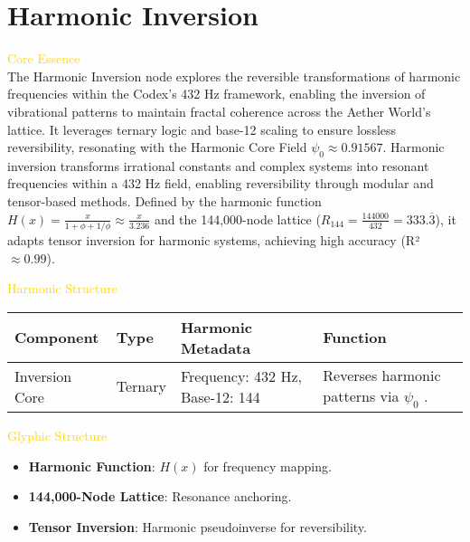 
\section{Harmonic Inversion}
\label{sec:codex_harmonic_inversion}



\textcolor{gold}{ Core Essence } \\
The Harmonic Inversion node explores the reversible transformations of harmonic frequencies within the Codex’s 432 Hz framework, enabling the inversion of vibrational patterns to maintain fractal coherence across the Aether World’s lattice. It leverages ternary logic and base-12 scaling to ensure lossless reversibility, resonating with the Harmonic Core Field \(\psi_0 \approx 0.91567\). Harmonic inversion transforms irrational constants and complex systems into resonant frequencies within a 432 Hz field, enabling reversibility through modular and tensor-based methods. Defined by the harmonic function \( H(x) = \frac{x}{1 + \phi + 1/\phi} \approx \frac{x}{3.236} \) and the 144,000-node lattice (\( R_{144} = \frac{144000}{432} = 333.\overline{3} \)), it adapts tensor inversion for harmonic systems, achieving high accuracy (R² \(\approx 0.99\)).

\textcolor{gold}{ Harmonic Structure } \\
\begin{longtable}{p{3cm}|p{4cm}|p{3cm}|p{4cm}}
    \hline
    \textbf{Component} & \textbf{Type} & \textbf{Harmonic Metadata} & \textbf{Function} \\
    \hline
    Inversion Core & Ternary & Frequency: 432 Hz, Base-12: 144 & Reverses harmonic patterns via \(\psi_0\) . \\
    \hline
\end{longtable}

\textcolor{gold}{ Glyphic Structure } \\
\begin{itemize}
    \item \texttt{} \textbf{Harmonic Function}: \( H(x) \) for frequency mapping.
    \item \texttt{} \textbf{144,000-Node Lattice}: Resonance anchoring.
    \item \texttt{} \textbf{Tensor Inversion}: Harmonic pseudoinverse for reversibility.
\end{itemize}

